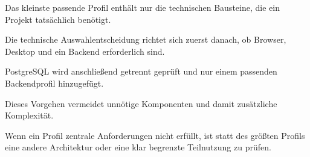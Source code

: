 \begin{beginnerstatement}

Das kleinste passende Profil enthält nur die technischen Bausteine, die ein
Projekt tatsächlich benötigt.

Die technische Auswahlentscheidung richtet sich zuerst danach, ob Browser,
Desktop und ein Backend erforderlich sind.

PostgreSQL wird anschließend getrennt geprüft und nur einem passenden
Backendprofil hinzugefügt.

Dieses Vorgehen vermeidet unnötige Komponenten und damit zusätzliche
Komplexität.

Wenn ein Profil zentrale Anforderungen nicht erfüllt, ist statt des größten
Profils eine andere Architektur oder eine klar begrenzte Teilnutzung zu prüfen.

\end{beginnerstatement}

